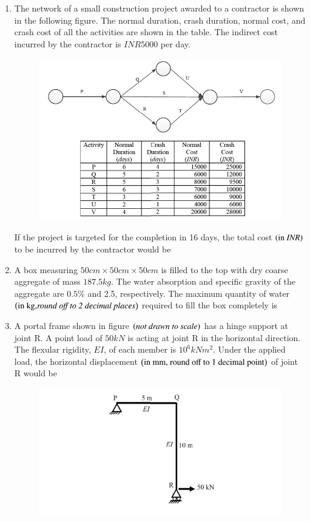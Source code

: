 \documentclass[journal,12pt,onecolumn]{IEEEtran}
\theoremstyle{remark}
\begin{document}
\begin{enumerate}
\hfill{}

\item The network of a small construction project awarded to a contractor is shown in the following figure. The normal duration, crash duration, normal cost, and crash cost of all the activities are shown in the table. The indirect cost incurred by the contractor is $INR 5000$ per day.

\begin{figure}[H]
\centering
\includegraphics[width=0.5\columnwidth]{figs/q37.png}
\caption*{}
\label{fig:Q.37}
\end{figure}
If the project is targeted for the completion in 16 days, the total cost $\left(\text{in }\textit{INR}\right)$ to be incurred by the contractor would be \underline{\hspace{2cm}}

\hfill{}

\item A box measuring $50cm\times50cm\times50cm$ is filled to the top with dry coarse aggregate of mass $187.5kg$. The water absorption and specific gravity of the aggregate are $0.5\%$ and 2.5, respectively. The maximum quantity of water $\left(\text{in kg,}\textit{round off to 2 decimal places}\right)$ required to fill the box completely is \underline{\hspace{2cm}}

\hfill{}

\item A portal frame shown in figure $\left(\textit{not drawn to scale}\right)$ has a hinge support at joint R. A point load of $50kN$ is acting at joint R in the horizontal direction. The flexular rigidity, $EI$, of each member is $10^6kNm^2$. Under the applied load, the horizontal displacement $\left(\text{in mm, round off to 1 decimal point}\right)$ of joint R would be \underline{\hspace{2cm}}

\hfill{}
\begin{figure}[H]
\centering
\includegraphics[width=0.5\columnwidth]{figs/q39.png}
\caption*{}
\label{fig:Q.39}
\end{figure}


\end{enumerate}
\end{document}
